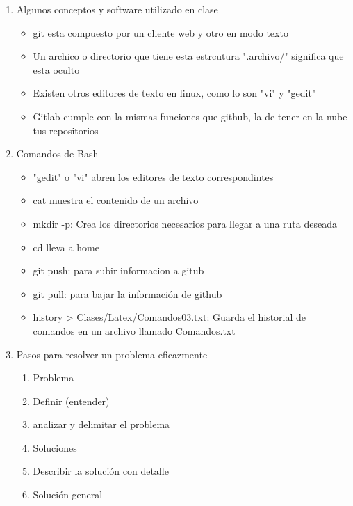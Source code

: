 \documentclass{book}
\begin{document}
   \begin{enumerate}%
   	\item Algunos conceptos y software utilizado en clase%
   	\begin{itemize}
   		\item git esta compuesto por un cliente web y otro en modo texto
   		\item Un archico o directorio que tiene esta estrcutura ".archivo/" significa que esta oculto
   		\item Existen otros editores de texto en linux, como lo son "vi" y "gedit"
   		\item Gitlab cumple con la mismas funciones que github, la de tener en la nube tus repositorios
   	\end{itemize}
   	
   	\item Comandos de Bash%
   	\begin{itemize}%
   		\item "gedit" o "vi" abren los editores de texto correspondintes
   		\item cat muestra el contenido de un archivo
   		\item mkdir -p: Crea los directorios necesarios para llegar a una ruta deseada
   		\item cd lleva a home
   		\item git push: para subir informacion a gitub
   		\item git pull: para bajar la información de github
   		\item history > Clases/Latex/Comandos03.txt:  Guarda el historial de comandos en un archivo llamado Comandos.txt
   		
   		
   	\end{itemize}%
   	\item Pasos para resolver un problema eficazmente
   	\begin{enumerate}
   		\item Problema
   		\item Definir (entender)
   		\item analizar y delimitar el problema
   		\item Soluciones
   		\item Describir la solución con detalle
   		\item Solución general
   	\end{enumerate}
   	
\end{enumerate}
\end{document}
